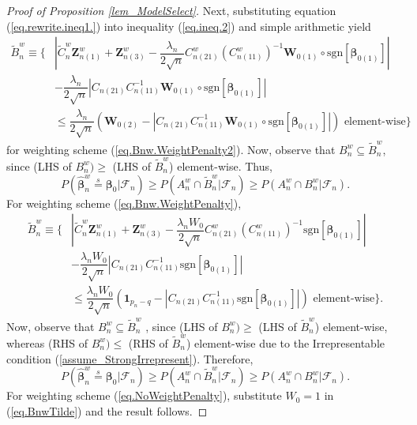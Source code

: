 \documentclass[ejs,authoryear,linksfromyear]{imsart}
\newcommand{\bnw}{\widehat{\bm{\beta}}_n^w} %
\newcommand{\cnwa}{C_{n(11)}^w}
\newcommand{\cnwc}{C_{n(21)}^w}
\newcommand{\znwa}{\bm{Z}_{n(1)}^w}
\newcommand{\znwc}{\bm{Z}_{n(3)}^w}
\numberwithin{equation}{section}
\theoremstyle{plain}
\begin{document}
\begin{proof}[Proof of Proposition \ref{lem_ModelSelect}]
	 Next, substituting equation (\ref{eq.rewrite.ineq1.}) into inequality (\ref{eq.ineq.2}) and simple arithmetic yield
	 \begin{equation*} 
	 \begin{split} 
	 \widetilde{B}_n^w \equiv \bigg\{
	 &\left\vert
	 \widetilde{C}^w_n \znwa 
	 + \znwc
	 - \dfrac{\lambda_n}{2 \sqrt{n}} 
	 \cnwc \left( \cnwa \right)^{-1} 
	 \bm{W}_{0(1)} \circ
	 \text{sgn} \left[ \bm{\beta}_{0(1)} \right] 
	 \right\vert \\
	 &- \dfrac{\lambda_n}{2 \sqrt{n}} 
	 \left|
	 C_{n(21)} C^{-1}_{n(11)}
	 \bm{W}_{0(1)} \circ
	 \text{sgn} \left[ \bm{\beta}_{0(1)} \right] 
	 \right|  \\
	 &\leq
	 \dfrac{\lambda_n}{2 \sqrt{n}} 
	 \left(
	 \bm{W}_{0(2)} 
	 - \left\vert
	 C_{n(21)} C^{-1}_{n(11)} 
	 \bm{W}_{0(1)} \circ
	 \text{sgn} \left[ \bm{\beta}_{0(1)} \right] 
	 \right\vert
	 \right)
	 \text{ element-wise}
	 \bigg\}
	 \end{split}
	 \end{equation*} 
	 for weighting scheme (\ref{eq.Bnw.WeightPenalty2}). Now, observe that $B_n^w \subseteq \widetilde{B}_n^w$, since (LHS of $B_n^w) \geq$ (LHS of $\widetilde{B}_n^w$) element-wise. Thus,
	 $$
	 P \left( \bnw \stackrel{s}{=} \bm{\beta}_0 \bigg| \mathcal{F}_n \right) 
	 \geq
	 P \left( 
	 A_n^w \cap \widetilde{B}_n^w 
	 \big| \mathcal{F}_n
	 \right) 
	 \geq
	 P \left( 
	 A_n^w \cap B_n^w 
	 \big| \mathcal{F}_n
	 \right).
	 $$
	 For weighting scheme (\ref{eq.Bnw.WeightPenalty}),
	 \begin{equation} \label{eq.BnwTilde}
	 \begin{split} 
	 \widetilde{B}_n^w \equiv \bigg\{
	 &\left\vert
	 \widetilde{C}^w_n \znwa 
	 + \znwc
	 - \dfrac{\lambda_n W_0}{2 \sqrt{n}} 
	 \cnwc \left( \cnwa \right)^{-1} 
	 \text{sgn} \left[ \bm{\beta}_{0(1)} \right] 
	 \right\vert \\
	 &- \dfrac{\lambda_n W_0}{2 \sqrt{n}} 
	 \left|
	 C_{n(21)} C^{-1}_{n(11)}
	 \text{sgn} \left[ \bm{\beta}_{0(1)} \right] 
	 \right|  \\
	 &\leq
	 \dfrac{\lambda_n W_0}{2 \sqrt{n}} 
	 \left(
	 \bm{1}_{p_n-q}
	 - \left\vert
	 C_{n(21)} C^{-1}_{n(11)} 
	 \text{sgn} \left[ \bm{\beta}_{0(1)} \right] 
	 \right\vert
	 \right)
	 \text{ element-wise}
	 \bigg\}. 
	 \end{split}
	 \end{equation} 
	 Now, observe that $B_n^w \subseteq \widetilde{B}_n^w$ , since (LHS of $B_n^w) \geq$ (LHS of $\widetilde{B}_n^w$) element-wise, whereas (RHS of $B_n^w) \leq$ (RHS of $\widetilde{B}_n^w$) element-wise due to the Irrepresentable condition (\ref{assume_StrongIrrepresent}). Therefore,
	 $$
	 P \left( \bnw \stackrel{s}{=} \bm{\beta}_0 \bigg| \mathcal{F}_n \right) 
	 \geq
	 P \left( 
	 A_n^w \cap \widetilde{B}_n^w 
	 \big| \mathcal{F}_n
	 \right) 
	 \geq
	 P \left( 
	 A_n^w \cap B_n^w 
	 \big| \mathcal{F}_n
	 \right).
	 $$
	 For weighting scheme (\ref{eq.NoWeightPenalty}), substitute $W_0 = 1$ in (\ref{eq.BnwTilde}) and the result follows. 
\end{proof}
\end{document}
